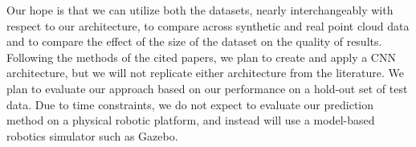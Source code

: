 \documentclass[letterpaper, 10 pt]{article}
\begin{document}
Our hope is that we can utilize both the datasets, nearly interchangeably with respect to our architecture, to compare across synthetic and real point cloud data and to compare the effect of the size of the dataset on the quality of results. 
Following the methods of the cited papers, we plan to create and apply a CNN architecture, but we will not replicate either architecture from the literature. 
We plan to evaluate our approach based on our performance on a hold-out set of test data. 
Due to time constraints, we do not expect to evaluate our prediction method on a physical robotic platform, and instead will use a model-based robotics simulator such as Gazebo. 




{\footnotesize
    
}
\end{document}
